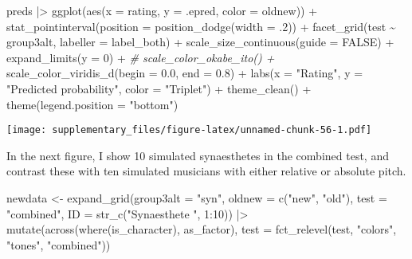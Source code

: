 \documentclass[
  man,floatsintext]{apa7}
\newenvironment{Shaded}{\begin{snugshade}}{\end{snugshade}}
\newcommand{\AttributeTok}[1]{\textcolor[rgb]{0.77,0.63,0.00}{#1}}
\newcommand{\CommentTok}[1]{\textcolor[rgb]{0.56,0.35,0.01}{\textit{#1}}}
\newcommand{\ConstantTok}[1]{\textcolor[rgb]{0.00,0.00,0.00}{#1}}
\newcommand{\DecValTok}[1]{\textcolor[rgb]{0.00,0.00,0.81}{#1}}
\newcommand{\FloatTok}[1]{\textcolor[rgb]{0.00,0.00,0.81}{#1}}
\newcommand{\FunctionTok}[1]{\textcolor[rgb]{0.00,0.00,0.00}{#1}}
\newcommand{\NormalTok}[1]{#1}
\newcommand{\OtherTok}[1]{\textcolor[rgb]{0.56,0.35,0.01}{#1}}
\newcommand{\SpecialCharTok}[1]{\textcolor[rgb]{0.00,0.00,0.00}{#1}}
\newcommand{\StringTok}[1]{\textcolor[rgb]{0.31,0.60,0.02}{#1}}
\begin{document}
\begin{Shaded}
\begin{Highlighting}[]
\NormalTok{preds }\SpecialCharTok{|\textgreater{}} 
  \FunctionTok{ggplot}\NormalTok{(}\FunctionTok{aes}\NormalTok{(}\AttributeTok{x =}\NormalTok{ rating, }\AttributeTok{y =}\NormalTok{ .epred, }\AttributeTok{color =}\NormalTok{ oldnew)) }\SpecialCharTok{+}
  \FunctionTok{stat\_pointinterval}\NormalTok{(}\AttributeTok{position =} \FunctionTok{position\_dodge}\NormalTok{(}\AttributeTok{width =}\NormalTok{ .}\DecValTok{2}\NormalTok{)) }\SpecialCharTok{+}
  \FunctionTok{facet\_grid}\NormalTok{(test }\SpecialCharTok{\textasciitilde{}}\NormalTok{ group3alt, }\AttributeTok{labeller =}\NormalTok{ label\_both) }\SpecialCharTok{+}
  \FunctionTok{scale\_size\_continuous}\NormalTok{(}\AttributeTok{guide =} \ConstantTok{FALSE}\NormalTok{) }\SpecialCharTok{+}
  \FunctionTok{expand\_limits}\NormalTok{(}\AttributeTok{y =} \DecValTok{0}\NormalTok{) }\SpecialCharTok{+}
  \CommentTok{\# scale\_color\_okabe\_ito() +}
  \FunctionTok{scale\_color\_viridis\_d}\NormalTok{(}\AttributeTok{begin =} \FloatTok{0.0}\NormalTok{, }\AttributeTok{end =} \FloatTok{0.8}\NormalTok{) }\SpecialCharTok{+}
  \FunctionTok{labs}\NormalTok{(}\AttributeTok{x =} \StringTok{"Rating"}\NormalTok{, }\AttributeTok{y =} \StringTok{"Predicted probability"}\NormalTok{, }\AttributeTok{color =} \StringTok{"Triplet"}\NormalTok{) }\SpecialCharTok{+}
  \FunctionTok{theme\_clean}\NormalTok{() }\SpecialCharTok{+}
  \FunctionTok{theme}\NormalTok{(}\AttributeTok{legend.position =} \StringTok{"bottom"}\NormalTok{)}
\end{Highlighting}
\end{Shaded}

\texttt{[image: supplementary\_files/figure-latex/unnamed-chunk-56-1.pdf]}

In the next figure, I show 10 simulated synaesthetes in the combined test, and contrast these with ten simulated musicians with either relative or absolute pitch.

\begin{Shaded}
\begin{Highlighting}[]
\NormalTok{newdata }\OtherTok{\textless{}{-}} \FunctionTok{expand\_grid}\NormalTok{(}\AttributeTok{group3alt =} \StringTok{"syn"}\NormalTok{,}
                       \AttributeTok{oldnew =} \FunctionTok{c}\NormalTok{(}\StringTok{"new"}\NormalTok{, }\StringTok{"old"}\NormalTok{),}
                       \AttributeTok{test =} \StringTok{"combined"}\NormalTok{, }
                       \AttributeTok{ID =} \FunctionTok{str\_c}\NormalTok{(}\StringTok{"Synaesthete "}\NormalTok{, }\DecValTok{1}\SpecialCharTok{:}\DecValTok{10}\NormalTok{)) }\SpecialCharTok{|\textgreater{}} 
  \FunctionTok{mutate}\NormalTok{(}\FunctionTok{across}\NormalTok{(}\FunctionTok{where}\NormalTok{(is\_character), as\_factor),}
         \AttributeTok{test =} \FunctionTok{fct\_relevel}\NormalTok{(test,}
                            \StringTok{"colors"}\NormalTok{, }\StringTok{"tones"}\NormalTok{, }\StringTok{"combined"}\NormalTok{))}
\end{Highlighting}
\end{Shaded}
\end{document}
